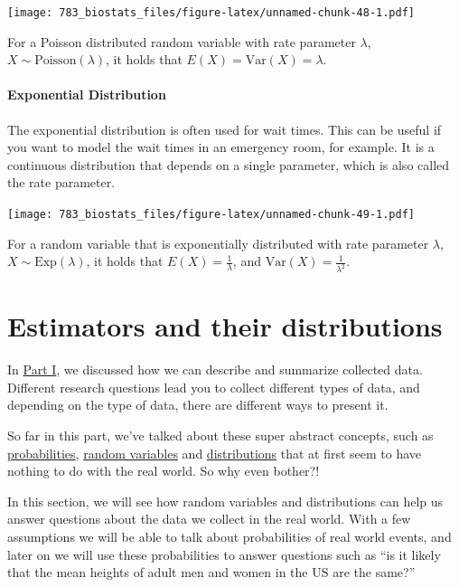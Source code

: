 \documentclass[]{book}
\theoremstyle{definition}
\theoremstyle{definition}
\theoremstyle{definition}
\theoremstyle{remark}
\begin{document}
\texttt{[image: 783\_biostats\_files/figure-latex/unnamed-chunk-48-1.pdf]}

For a Poisson distributed random variable with rate parameter \(\lambda\), \(X \sim \text{Poisson}(\lambda)\), it holds that \(E(X) = \text{Var}(X) = \lambda\).

\hypertarget{exponential-distribution}{%
\subsubsection{Exponential Distribution}\label{exponential-distribution}}

The exponential distribution is often used for wait times. This can be useful if you want to model the wait times in an emergency room, for example. It is a continuous distribution that depends on a single parameter, which is also called the rate parameter.

\texttt{[image: 783\_biostats\_files/figure-latex/unnamed-chunk-49-1.pdf]}

For a random variable that is exponentially distributed with rate parameter \(\lambda\), \(X \sim \text{Exp}(\lambda)\), it holds that \(E(X) = \frac{1}{\lambda}\), and \(\text{Var}(X) = \frac{1}{\lambda^2}\).

\hypertarget{estimators-and-their-distributions}{%
\chapter{Estimators and their distributions}\label{estimators-and-their-distributions}}

In \protect\hyperlink{discrete}{Part I}, we discussed how we can describe and summarize collected data. Different research questions lead you to collect different types of data, and depending on the type of data, there are different ways to present it.

So far in this part, we've talked about these super abstract concepts, such as \protect\hyperlink{what-is-probability}{probabilities}, \protect\hyperlink{random-variables}{random variables} and \protect\hyperlink{a-few-important-distributions}{distributions} that at first seem to have nothing to do with the real world. So why even bother?!

In this section, we will see how random variables and distributions can help us answer questions about the data we collect in the real world. With a few assumptions we will be able to talk about probabilities of real world events, and later on we will use these probabilities to answer questions such as ``is it likely that the mean heights of adult men and women in the US are the same?''
\end{document}

